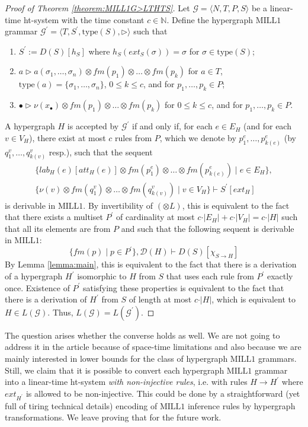 \documentclass[a4paper,UKenglish,cleveref, autoref, thm-restate,pdfa]{lipics-v2021}
\newcommand{\eqdef}{:=}
\newcommand{\Nat}{\mathbb{N}}
\newcommand{\Gram}{\mathcal{G}}
\newcommand{\lab}{\mathit{lab}}
\newcommand{\att}{\mathit{att}}
\newcommand{\ext}{\mathit{ext}}
\newcommand{\type}{\mathrm{type}}
\newcommand{\mconj}{\otimes}
\newcommand{\MILLFO}{\mathrm{MILL}1}
\newcommand{\fm}{\mathit{fm}}
\newcommand{\diag}{\mathcal{D}}
\begin{document}
\begin{proof}[Proof of Theorem \ref{theorem:MILL1G>LTHTS}]
	Let $\Gram = \langle N, T, P, S\rangle$ be a linear-time ht-system with the time constant $c \in \Nat$. Define the hypergraph $\MILLFO$ grammar $\Gram^\prime = \langle T, S^\prime, \type(S), \triangleright \rangle$ such that
	\begin{enumerate}
		\item $S^\prime \eqdef D(S)[h_S]$ where $h_S(\ext_S(\sigma))=\sigma$ for $\sigma \in \type(S)$;
		\item $a \triangleright a(\sigma_1,\ldots,\sigma_n) \mconj \fm(p_1) \mconj \ldots \mconj \fm(p_k)$ for $a \in T$, $\type(a)=\{\sigma_1,\ldots,\sigma_n\}$, $0 \le k \le c$, and for $p_1,\ldots,p_k \in P$;
		\item $\bullet \triangleright \nu(x_\bullet) \mconj \fm(p_1) \mconj \ldots \mconj \fm(p_k)$ for $0 \le k \le c$, and for $p_1,\ldots,p_k \in P$.
	\end{enumerate}
	A hypergraph $H$ is accepted by $\Gram^\prime$ if and only if, for each $e \in E_H$ (and for each $v \in V_H$), there exist at most $c$ rules from $P$, which we denote by $p_1^e,\ldots,p_{k(e)}^e$ (by $q_1^v,\ldots,q_{k(v)}^v$ resp.), such that the sequent
	\begin{multline*}
		\{\lab_H(e)[\att_H(e)]\mconj \fm(p^e_1) \mconj \ldots \mconj \fm(p^e_{k(e)})  \mid e \in E_H\}, 
		\\
		\{\nu(v)\mconj \fm(q^v_1) \mconj \ldots \mconj \fm(q^v_{k(v)}) \mid v \in V_H\} \vdash S^\prime[\ext_H]
	\end{multline*}
	is derivable in $\MILLFO$. By invertibility of $(\mconj L)$, this is equivalent to the fact that there exists a multiset $P^\prime$ of cardinality at most $c \cdot \vert E_H \vert + c \cdot \vert V_H \vert = c \cdot \vert H \vert$ such that all its elements are from $P$ and such that the following sequent is derivable in $\MILLFO$:
	$$
		\{\fm(p) \mid p \in P^\prime\}, \diag(H) \vdash D(S)[\chi_{S \to H}]
	$$
	By Lemma \ref{lemma:main}, this is equivalent to the fact that there is a derivation of a hypergraph $H^\prime$ isomorphic to $H$ from $S$ that uses each rule from $P^\prime$ exactly once. Existence of $P^\prime$ satisfying these properties is equivalent to the fact that there is a derivation of $H^\prime$ from $S$ of length at most $c \cdot \vert H \vert$, which is equivalent to $H \in L(\Gram)$. Thus, $L(\Gram)=L(\Gram^\prime)$.
\end{proof}
The question arises whether the converse holds as well. We are not going to address it in the article because of space-time limitations and also because we are mainly interested in lower bounds for the class of hypergraph $\MILLFO$ grammars. Still, we claim that it is possible to convert each hypergraph $\MILLFO$ grammar into a linear-time ht-system \emph{with non-injective rules}, i.e. with rules $H \to H^\prime$ where $\ext_{H^\prime}$ is allowed to be non-injective. This could be done by a straightforward (yet full of tiring technical details) encoding of $\MILLFO$ inference rules by hypergraph transformations. We leave proving that for the future work.
\end{document}
